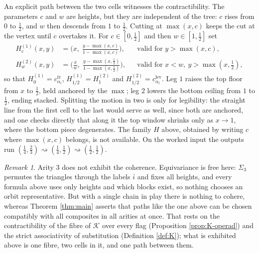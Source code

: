 \documentclass[12pt]{amsart}
\theoremstyle{definition}
\theoremstyle{remark}
\newtheorem{remark}[subsection]{Remark}
\newcommand{\Kop}{\mathcal{K}}                   %
\begin{document}
An explicit path between the two cells witnesses the contractibility. The parameters $c$ and $w$ are heights, but they are independent of the tree: $c$ rises from $0$ to $\tfrac12$, and $w$ then descends from $1$ to $\tfrac12$. Cutting at $\max(x,c)$ keeps the cut at the vertex until $c$ overtakes it. For $c\in[0,\tfrac12]$ and then $w\in[1,\tfrac12]$ set
\begin{align}
 H^{(1)}_{c}(x,y) &= \Big( x, \; \frac{y - \max(x,c)}{1-\max(x,c)} \Big), && \text{valid for } y > \max(x,c), \label{eq:leg1-3}\\
 H^{(2)}_{w}(x,y) &= \Big( \frac{x}{w}, \; \frac{y - \max(x,\tfrac12)}{1-\max(x,\tfrac12)} \Big), && \text{valid for } x < w, \ y > \max(x,\tfrac12), \label{eq:leg2-3}
\end{align}
so that $H^{(1)}_0 = c^{\mathrm{tr}}_{\alpha_i}$, $H^{(1)}_{1/2} = H^{(2)}_{1}$ and $H^{(2)}_{1/2} = c^{\mathrm{lev}}_{\alpha_i}$. Leg $1$ raises the top floor from $x$ to $\tfrac12$, held anchored by the $\max$; leg $2$ lowers the bottom ceiling from $1$ to $\tfrac12$, ending stacked. Splitting the motion in two is only for legibility: the straight line from the first cell to the last would serve as well, since both are anchored, and one checks directly that along it the top window shrinks only as $x\to 1$, where the bottom piece degenerates. The family $H$ above, obtained by writing $c$ where $\max(x,c)$ belongs, is not available. On the worked input the outputs run $(\tfrac14,\tfrac23)\rightsquigarrow(\tfrac14,\tfrac12)\rightsquigarrow(\tfrac12,\tfrac12)$.

\begin{remark}
Arity $3$ does not exhibit the coherence. Equivariance is free here: $\Sigma_3$ permutes the triangles through the labels $\overline{i}$ and fixes all heights, and every formula above uses only heights and which blocks exist, so nothing chooses an orbit representative. But with a single chain in play there is nothing to cohere, whereas Theorem \ref{thm:main} asserts that paths like the one above can be chosen compatibly with all composites in all arities at once. That rests on the contractibility of the fibre of $\Kop$ over every flag (Proposition \ref{prop:K-operad}) and the strict associativity of substitution (Definition \ref{def:K}); what is exhibited above is one fibre, two cells in it, and one path between them.
\end{remark}



\end{document}
